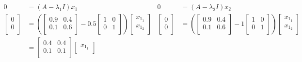 \documentclass[titlepage]{article}
\begin{document}
\begin{align*}
    0 &= (A-\lambda_1I)x_1&
        0 &= (A-\lambda_2I)x_2\\
    \begin{bmatrix}
        0\\
        0\\
    \end{bmatrix}    
    &= \left( 
        \begin{bmatrix}
            0.9 & 0.4\\
            0.1 & 0.6\\
        \end{bmatrix}
        -0.5
        \begin{bmatrix}
            1 & 0\\
            0 & 1\\
        \end{bmatrix}
    \right)
    \begin{bmatrix}
        x_{1_1}\\
        x_{1_2}\\
    \end{bmatrix}&
        \begin{bmatrix}
            0\\
            0\\
        \end{bmatrix}
        &= \left( 
            \begin{bmatrix}
                0.9 & 0.4\\
                0.1 & 0.6\\
            \end{bmatrix}
            -1
            \begin{bmatrix}
                1 & 0\\
                0 & 1\\
            \end{bmatrix}
        \right)
        \begin{bmatrix}
            x_{1_1}\\
            x_{1_2}\\
        \end{bmatrix}\\
    &=
    \begin{bmatrix}
        0.4 & 0.4\\
        0.1 & 0.1\\
    \end{bmatrix}
    \begin{bmatrix}
        x_{1_1}\\

\end{bmatrix}
\end{align*}
\end{document}
